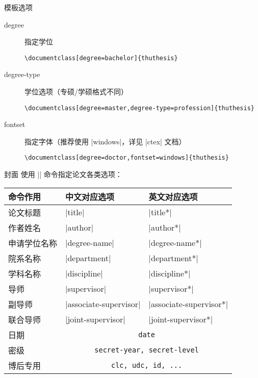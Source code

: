 \begin{frame}[fragile]{模板选项}
\begin{description}
\item[degree] 指定学位
  \begin{lstlisting}[basicstyle=\ttfamily]
\documentclass[degree=bachelor]{thuthesis}
  \end{lstlisting}
\item[degree-type] 学位选项（专硕/学硕格式不同）
  \begin{lstlisting}[basicstyle=\ttfamily]
\documentclass[degree=master,degree-type=profession]{thuthesis}
  \end{lstlisting}
\item[fontset] 指定字体（推荐使用 |windows|，详见 |ctex| 文档）
  \begin{lstlisting}[basicstyle=\ttfamily]
\documentclass[degree=doctor,fontset=windows]{thuthesis}
  \end{lstlisting}
\end{description}
\end{frame}

\begin{frame}[fragile]{封面}
  使用 |\thusetup| 命令指定论文各类选项：
  \begin{table}[h]
    \centering
\footnotesize
  \begin{tabular}{lll}
    命令作用 & 中文对应选项 & 英文对应选项 \\\hline\hline
  论文标题 & |title| & |title*| \\
  作者姓名&  |author| &|author*|\\
  申请学位名称 & |degree-name|&|degree-name*|\\
  院系名称 & |department| & |department*|\\
  学科名称 & |discipline| & |discipline*|\\
  导师 & |supervisor| & |supervisor*|\\
  副导师 & |associate-supervisor| & |associate-supervisor*|\\
  联合导师 & |joint-supervisor| & |joint-supervisor*|\\
  日期 & \multicolumn{2}{c|}{\texttt{date}}\\
  密级 & \multicolumn{2}{c|}{\texttt{secret-year, secret-level}}\\
  博后专用 & \multicolumn{2}{c|}{\texttt{clc, udc, id, ...}}\hline
  \end{tabular}
  \end{table}
\end{frame}

